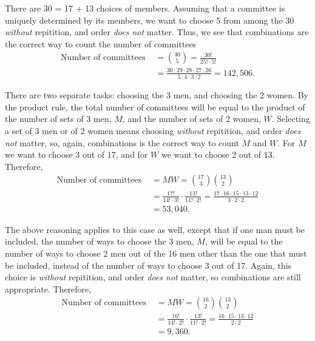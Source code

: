 \documentclass[11pt, newpage]{homework}
\begin{document}
\begin{alphaparts}
	\questionpart %
	There are 30 = 17 + 13 choices of members. Assuming that a committee is uniquely determined by its members, we want to choose 5 from among the 30 \textit{without} repitition, and order \textit{does not} matter. Thus, we see that combinations are the correct way to count the number of committees
	\begin{align*}
		\text{Number of committees } &= \binom{30}{5} = \frac{30!}{25!\cdot5!}\\
		&= \frac{30\cdot29\cdot28\cdot27\cdot26}{5\cdot4\cdot3\cdot2} = 142,506.
	\end{align*}

	\questionpart %
	There are two separate tasks: choosing the 3 men, and choosing the 2 women. By the product rule, the total number of committees will be equal to the product of the number of sets of 3 men, \(M\), and the number of sets of 2 women, \(W\). Selecting a set of 3 men or of 2 women means choosing \textit{without} repitition, and order \textit{does not} matter, so, again, combinations is the correct way to count \(M\) and \(W\). For \(M\) we want to choose 3 out of 17, and for \(W\) we want to choose 2 out of 13. Therefore,
	\begin{align*}
		\text{Number of committees } &= MW = \binom{17}{3}\binom{13}{2}\\
		&= \frac{17!}{14!\cdot3!}\cdot \frac{13!}{11!\cdot2!} = \frac{17\cdot16\cdot15\cdot13\cdot12}{3\cdot2\cdot2}\\
		&= 53,040.
	\end{align*}

	\questionpart %
	The above reasoning applies to this case as well, except that if one man must be included, the number of ways to choose the 3 men, \(M\), will be equal to the number of ways to choose 2 men out of the 16 men other than the one that must be included, instead of the number of ways to choose 3 out of 17. Again, this choice is \textit{without} repitition, and order \textit{does not} matter, so combinations are still appropriate. Therefore,
	\begin{align*}
		\text{Number of committees } &= MW = \binom{16}{2}\binom{13}{2}\\
		&= \frac{16!}{14!\cdot2!}\cdot\frac{13!}{11!\cdot2!} = \frac{16 \cdot15\cdot13\cdot12}{2 \cdot2}\\
		&= 9,360.
	\end{align*}
\end{alphaparts}
\end{document}
